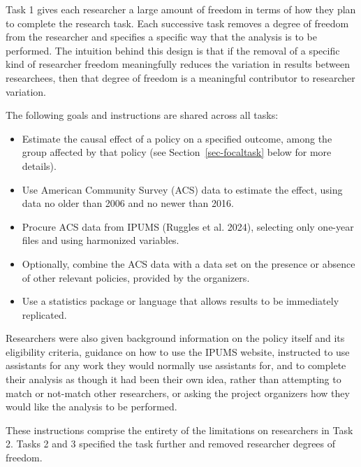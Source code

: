\documentclass[
  letterpaper,
  DIV=11,
  numbers=noendperiod]{scrartcl}
\begin{document}
Task 1 gives each researcher a large amount of freedom in terms of how
they plan to complete the research task. Each successive task removes a
degree of freedom from the researcher and specifies a specific way that
the analysis is to be performed. The intuition behind this design is
that if the removal of a specific kind of researcher freedom
meaningfully reduces the variation in results between researchees, then
that degree of freedom is a meaningful contributor to researcher
variation.

The following goals and instructions are shared across all tasks:

\begin{itemize}
\item
  Estimate the causal effect of a policy on a specified outcome, among
  the group affected by that policy (see Section~\ref{sec-focaltask}
  below for more details).
\item
  Use American Community Survey (ACS) data to estimate the effect, using
  data no older than 2006 and no newer than 2016.
\item
  Procure ACS data from IPUMS (Ruggles et al. 2024), selecting only
  one-year files and using harmonized variables.
\item
  Optionally, combine the ACS data with a data set on the presence or
  absence of other relevant policies, provided by the organizers.
\item
  Use a statistics package or language that allows results to be
  immediately replicated.
\end{itemize}

Researchers were also given background information on the policy itself
and its eligibility criteria, guidance on how to use the IPUMS website,
instructed to use assistants for any work they would normally use
assistants for, and to complete their analysis as though it had been
their own idea, rather than attempting to match or not-match other
researchers, or asking the project organizers how they would like the
analysis to be performed.

These instructions comprise the entirety of the limitations on
researchers in Task 2. Tasks 2 and 3 specified the task further and
removed researcher degrees of freedom.
\end{document}
